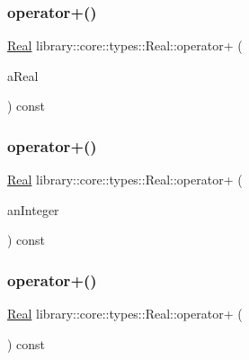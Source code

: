 \subsubsection{\texorpdfstring{operator+()}{operator+()}\hspace{0.1cm}{\footnotesize\ttfamily [2/4]}}
{\footnotesize\ttfamily \hyperlink{classlibrary_1_1core_1_1types_1_1_real}{Real} library\+::core\+::types\+::\+Real\+::operator+ (\begin{DoxyParamCaption}\item[{const \hyperlink{classlibrary_1_1core_1_1types_1_1_real_a9c5c8826b7e5a8e39544d23fea6c0e1c}{Real\+::\+Value\+Type} \&}]{a\+Real }\end{DoxyParamCaption}) const}

\mbox{\label{classlibrary_1_1core_1_1types_1_1_real_a5b8ec99c8c2f846228c62724870671e8}} 
\subsubsection{\texorpdfstring{operator+()}{operator+()}\hspace{0.1cm}{\footnotesize\ttfamily [3/4]}}
{\footnotesize\ttfamily \hyperlink{classlibrary_1_1core_1_1types_1_1_real}{Real} library\+::core\+::types\+::\+Real\+::operator+ (\begin{DoxyParamCaption}\item[{const \hyperlink{classlibrary_1_1core_1_1types_1_1_integer}{Integer} \&}]{an\+Integer }\end{DoxyParamCaption}) const}

\mbox{\label{classlibrary_1_1core_1_1types_1_1_real_a7f39b72df1d66f354dce558a99dc2da5}} 
\subsubsection{\texorpdfstring{operator+()}{operator+()}\hspace{0.1cm}{\footnotesize\ttfamily [4/4]}}
{\footnotesize\ttfamily \hyperlink{classlibrary_1_1core_1_1types_1_1_real}{Real} library\+::core\+::types\+::\+Real\+::operator+ (\begin{DoxyParamCaption}{ }\end{DoxyParamCaption}) const}

